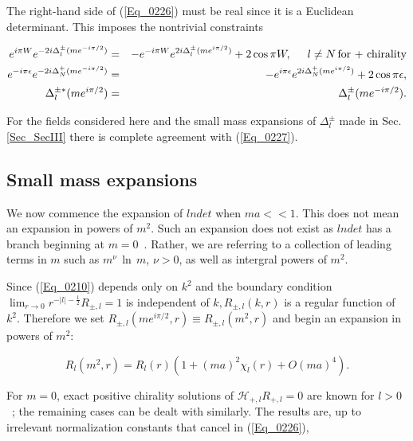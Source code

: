 \documentclass[a4paper,twocolumn,showpacs,preprintnumbers,amsmath,amssymb]{revtex4}
\newcommand{\half}{\frac{1}{2}}
\begin{document}
The right-hand side of (\ref{Eq_0226}) must be real since it is a
Euclidean determinant. This imposes the nontrivial constraints

\begin{widetext}
\begin{eqnarray}
\label{Eq_0227}
\nonumber
e^{i\pi W} e^{-2i \Delta^{\pm}_l(me^{-i\pi/2})}
  &=& -e^{-i\pi W} e^{2i \Delta^{\pm}_l(me^{i\pi/2})}
      + 2 \, \text{cos} \, \pi W, \hspace{5mm} l \neq N \,
      \text{for + chirality}\\
\nonumber
e^{-i\pi\epsilon} e^{-2i\Delta^{+}_N (me^{-i\pi/2})}
  &=& -e^{i\pi\epsilon} e^{2i\Delta^{+}_N (me^{i\pi/2})}
      + 2 \, \text{cos} \, \pi \epsilon,\\
\Delta^{\pm *}_l (me^{i\pi/2})
  &=& \Delta^{\pm}_l (me^{-i\pi/2}).
\end{eqnarray}
\end{widetext}

\noindent
For the fields considered here and the small mass expansions of
$\Delta^{\pm}_l$ made in Sec. \ref{Sec_SecIII} there is complete
agreement with (\ref{Eq_0227}).

\subsection{\label{SubSec_SmallMass}
Small mass expansions}

We now commence the expansion of $lndet$ when $ma<<1$. This does not
mean an expansion in powers of $m^2$. Such an expansion does not exist as
$lndet$ has a branch beginning at $m = 0$~\cite{Fry00a}. Rather, we are referring
to a collection of leading terms in $m$ such as $m^{\nu} \, \ln \, m$,
$\nu > 0$, as well as intergral powers of $m^2$.

Since (\ref{Eq_0210}) depends only on $k^2$ and the boundary condition
$\lim_{r \to 0} r^{-|l| - \half} R_{\pm,l} = 1$ is independent of
$k, R_{\pm,l}(k,r)$ is a regular function of $k^2$. Therefore we set
$R_{\pm,l}(me^{i\pi/2}, r) \equiv R_{\pm,l}(m^2,r)$ and begin an
expansion in powers of $m^2$:

\begin{equation}
\label{Eq_0228}
R_l(m^2,r) = R_l(r) (1 + (ma)^2 \chi_l(r) + O(ma)^4).
\end{equation}

\noindent
For $m = 0$, exact positive chirality solutions of
$\mathcal{H}_{+,l} R_{+,l} = 0$ are
known for $l > 0$~\cite{Jaroszewicz86}; the remaining cases can be
dealt with similarly. The results are, up to irrelevant normalization
constants that cancel in (\ref{Eq_0226}),
\end{document}
